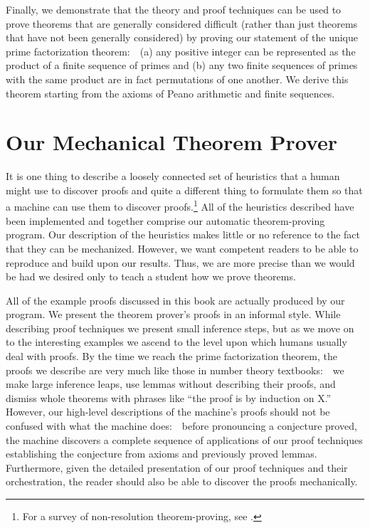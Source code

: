 \documentclass[10pt]{book}
\begin{document}
Finally, we demonstrate that the theory and proof techniques
can be used to prove theorems that are generally considered difficult
(rather than just theorems that have not been generally considered)
by proving our statement of the unique prime factorization theorem:~~(a) any
positive integer can be represented as the product of a finite sequence of
primes and (b) any two finite sequences of primes with the same product are in fact
permutations of one another.  We derive this theorem starting from
the axioms of Peano arithmetic and finite sequences.

\section{Our Mechanical Theorem Prover}
It is one thing to describe a loosely connected
set of heuristics that a human might use to discover proofs and quite
a different thing to formulate them so that a machine can use them to discover proofs.\footnote{For a survey of non-resolution theorem-proving, see \cite{BLEDSOESURVEY}.}
All of the heuristics described have been implemented and together 
comprise our automatic theorem-proving program.
Our description of the heuristics  makes little or no
reference to the fact that they can be mechanized.  However, we want
competent readers to be able to reproduce and build upon
our results.  Thus, we are more precise than we would be
had we desired only to teach a student how we prove theorems.

All of the example proofs discussed in this book are actually
produced by our program.
We present the theorem prover's proofs in an informal
style.  While describing proof techniques we present small
inference steps, but as we move on to the interesting examples
we ascend to the level upon which humans usually deal with
proofs.  By the time we reach the prime factorization theorem,
the proofs we describe are very much like those in number
theory textbooks:~~we make large inference leaps, use lemmas
without describing their proofs, and dismiss whole theorems
with phrases like ``the proof is by induction on X.''
However, our high-level descriptions of the machine's proofs
should not be confused with what the machine does:~~before pronouncing a conjecture proved, the machine
discovers a complete sequence of applications of our proof techniques
establishing the conjecture from axioms and previously proved lemmas.
Furthermore, given the detailed presentation of our proof techniques
and their orchestration, the reader should also be able to discover
the proofs mechanically.
\end{document}
